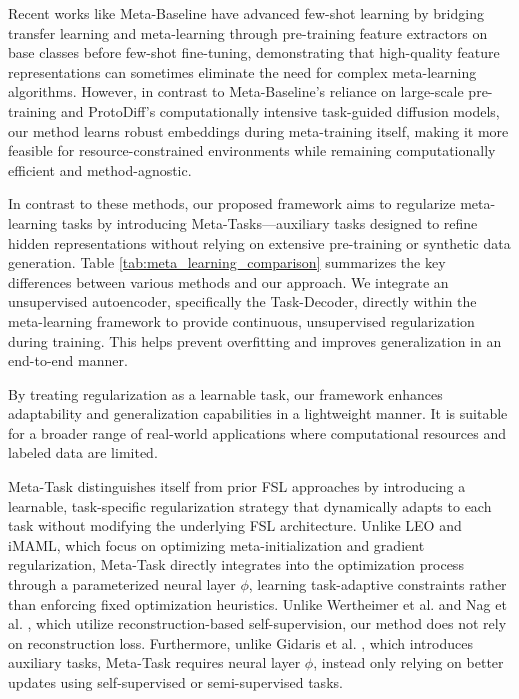 Recent works like Meta-Baseline \cite{chen2021metamix} have advanced few-shot learning by bridging transfer learning and meta-learning through pre-training feature extractors on base classes before few-shot fine-tuning, demonstrating that high-quality feature representations can sometimes eliminate the need for complex meta-learning algorithms. However, in contrast to Meta-Baseline's reliance on large-scale pre-training and ProtoDiff's \cite{du2023protodiff} computationally intensive task-guided diffusion models, our method learns robust embeddings during meta-training itself, making it more feasible for resource-constrained environments while remaining computationally efficient and method-agnostic.

In contrast to these methods, our proposed framework aims to regularize meta-learning tasks by introducing Meta-Tasks—auxiliary tasks designed to refine hidden representations without relying on extensive pre-training or synthetic data generation. Table \ref{tab:meta_learning_comparison} summarizes the key differences between various methods and our approach. We integrate an unsupervised autoencoder, specifically the Task-Decoder, directly within the meta-learning framework to provide continuous, unsupervised regularization during training. This helps prevent overfitting and improves generalization in an end-to-end manner.

By treating regularization as a learnable task, our framework enhances adaptability and generalization capabilities in a lightweight manner. It is suitable for a broader range of real-world applications where computational resources and labeled data are limited.

Meta-Task distinguishes itself from prior FSL approaches by introducing a learnable, task-specific regularization strategy that dynamically adapts to each task without modifying the underlying FSL architecture. Unlike LEO and iMAML, which focus on optimizing meta-initialization and gradient regularization, Meta-Task directly integrates into the optimization process through a parameterized neural layer $\phi$, learning task-adaptive constraints rather than enforcing fixed optimization heuristics. Unlike Wertheimer et al. \cite{wertheimer2021few} and Nag et al. \cite{nag2023reconstruction}, which utilize reconstruction-based self-supervision, our method does not rely on reconstruction loss. Furthermore, unlike Gidaris et al. \cite{gidaris2019boosting}, which introduces auxiliary tasks, Meta-Task requires neural layer $\phi$, instead only relying on better updates using self-supervised or semi-supervised tasks.

